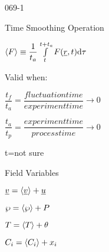 \begin{mitframe}{069-1}


\begin{listone}

\item Time Smoothing Operation
		
        \begin{listtwo}
        \item $\langle\force\rangle\equiv\dfrac{1}{t_{\activity}}\int\limits_{t}^{t+t_{\activity}}\force(\uline{\pos}, t)\mathrm{d}\torque$
        \item Valid when:
        
       			\begin{listthree}
                   \item $\dfrac{t_f}{t_a}=\dfrac{fluctuation time}{experiment time}\rightarrow{0}$
                    \item$\dfrac{t_a}{t_p}=\dfrac{experiment    time}{process time}\rightarrow {0}$
                    \end{listthree}

      t=not sure         

\end{listtwo}

\item Field Variables
		\begin{listtwo}
       \item$ \uline{\vvel}=\langle\uline{\vvel}\rangle+\uline{\forcepot}$
       
       \item $\dynpress=\langle\dynpress\rangle+\p$
       
       \item $\Temp=\langle\Temp\rangle+\theta$
       
       \item$\conc_{\state}=\langle\conc_{\state}\rangle+\specfrac{i}$
       
       

\end{listtwo}
\end{listone}
\end{mitframe}